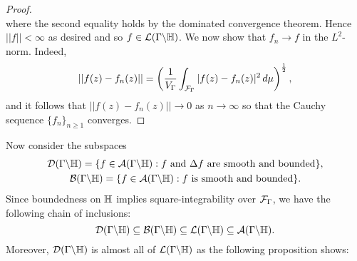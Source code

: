 \begin{proof}
\[        \]
        where the second equality holds by the dominated convergence theorem. Hence $||f|| < \infty$ as desired and so $f \in \mathcal{L}(\Gamma\backslash\mathbb{H})$. We now show that $f_{n} \to f$ in the $L^{2}$-norm. Indeed,
        \[
          ||f(z)-f_{n}(z)|| = \left(\frac{1}{V_{\Gamma}}\int_{\mathcal{F}_{\Gamma}}|f(z)-f_{n}(z)|^{2}\,d\mu\right)^{\frac{1}{2}},
        \]
        and it follows that $||f(z)-f_{n}(z)|| \to 0$ as $n \to \infty$ so that the Cauchy sequence $\{f_{n}\}_{n \ge 1}$ converges.
      \end{proof}

      Now consider the subspaces
      \begin{gather*}
        \mathcal{D}(\Gamma\backslash\mathbb{H}) = \{f \in \mathcal{A}(\Gamma\backslash\mathbb{H}):\text{$f$ and $\Delta f$ are smooth and bounded}\}, \\
        \mathcal{B}(\Gamma\backslash\mathbb{H}) = \{f \in \mathcal{A}(\Gamma\backslash\mathbb{H}):\text{$f$ is smooth and bounded}\}.
      \end{gather*}
      Since boundedness on $\mathbb{H}$ implies square-integrability over $\mathcal{F}_{\Gamma}$, we have the following chain of inclusions:
      \[
        \mathcal{D}(\Gamma\backslash\mathbb{H}) \subseteq \mathcal{B}(\Gamma\backslash\mathbb{H}) \subseteq \mathcal{L}(\Gamma\backslash\mathbb{H}) \subseteq \mathcal{A}(\Gamma\backslash\mathbb{H}).
      \]
      Moreover, $\mathcal{D}(\Gamma\backslash\mathbb{H})$ is almost all of $\mathcal{L}(\Gamma\backslash\mathbb{H})$ as the following proposition shows:

